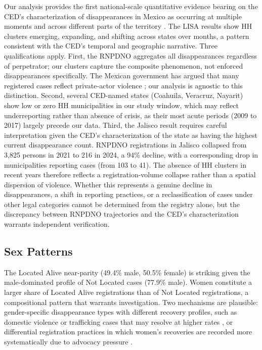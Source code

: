 Our analysis provides the first national-scale quantitative evidence bearing on the CED's characterization of disappearances in Mexico as occurring at multiple moments and across different parts of the territory \citep{CED_MEX_art34_2026}.
The LISA results show HH clusters emerging, expanding, and shifting across states over \nmonths{} months, a pattern consistent with the CED's temporal and geographic narrative.
Three qualifications apply.
First, the RNPDNO aggregates all disappearances regardless of perpetrator; our clusters capture the composite phenomenon, not enforced disappearances specifically.
The Mexican government has argued that many registered cases reflect private-actor violence \citep{CED_MEX_visit_2022}; our analysis is agnostic to this distinction.
Second, several CED-named states (Coahuila, Veracruz, Nayarit) show low or zero HH municipalities in our study window, which may reflect underreporting rather than absence of crisis, as their most acute periods (2009 to 2017) largely precede our data.
Third, the Jalisco result requires careful interpretation given the CED's characterization of the state as having the highest current disappearance count.
RNPDNO registrations in Jalisco collapsed from 3,825 persons in 2021 to 216 in 2024, a 94\% decline, with a corresponding drop in municipalities reporting cases (from 103 to 41).
The absence of HH clusters in recent years therefore reflects a registration-volume collapse rather than a spatial dispersion of violence.
Whether this represents a genuine decline in disappearances, a shift in reporting practices, or a reclassification of cases under other legal categories cannot be determined from the registry alone, but the discrepancy between RNPDNO trajectories and the CED's characterization warrants independent verification.

\subsection{Sex Patterns}
\label{sec:disc_sex}

The Located Alive near-parity (49.4\% male, 50.5\% female) is striking given the male-dominated profile of Not Located cases (77.9\% male).
Women constitute a larger share of Located Alive registrations than of Not Located registrations, a compositional pattern that warrants investigation.
Two mechanisms are plausible: gender-specific disappearance types with different recovery profiles, such as domestic violence or trafficking cases that may resolve at higher rates \citep{frias_2023}, or differential registration practices in which women's recoveries are recorded more systematically due to advocacy pressure \citep{schwartz_marin_2016}.

